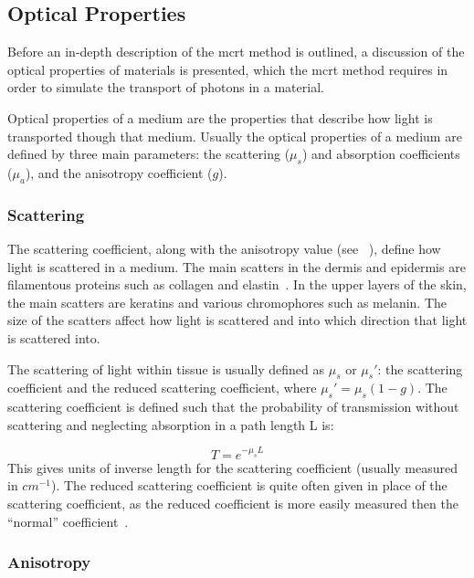 \subsection{Optical Properties}\label{sec:optprop}

Before an in-depth description of the \gls*{mcrt} method is outlined, a discussion of the optical properties of materials is presented, which the \gls*{mcrt} method requires in order to simulate the transport of photons in a material.

Optical properties of a medium are the properties that describe how light is transported though that medium. Usually the optical properties of a medium are defined by three main parameters: the scattering ($\mu_s$) and absorption coefficients ($\mu_a$), and the anisotropy coefficient ($g$).

\subsubsection*{Scattering}\label{sec:scatt}

The scattering coefficient, along with the anisotropy value (see ~), define how light is scattered in a medium. The main scatters in the dermis and epidermis are filamentous proteins such as collagen and elastin~\cite{jacques1996origins}. In the upper layers of the skin, the main scatters are keratins and various chromophores such as melanin. 
The size of the scatters affect how light is scattered and into which direction that light is scattered into.

\medskip

The scattering of light within tissue is usually defined as $\mu_s$ or $\mu_s'$: the scattering coefficient and the reduced scattering coefficient, where $\mu_s'=\mu_s(1-g)$. The scattering coefficient is defined such that the probability of transmission without scattering and neglecting absorption in a path length L is:

\begin{equation}
	T=e^{-\mu_sL}
\end{equation}
This gives units of inverse length for the scattering coefficient (usually measured in $cm^{-1}$). The reduced scattering coefficient is quite often given in place of the scattering coefficient, as the reduced coefficient is more easily measured then the ``normal'' coefficient~\cite{jacques2013optical}.



\subsubsection*{Anisotropy}\label{sec:ansio}

